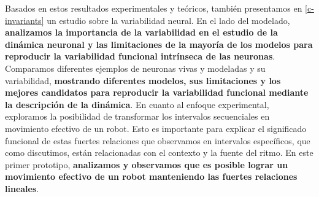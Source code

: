 Basados en estos resultados experimentales y teóricos, también presentamos en \ref{c-invariants} un estudio sobre la variabilidad neural. En el lado del modelado, \textbf{analizamos la importancia de la variabilidad en el estudio de la dinámica neuronal y las limitaciones de la mayoría de los modelos para reproducir la variabilidad funcional intrínseca de las neuronas}. Comparamos diferentes ejemplos de neuronas vivas y modeladas y su variabilidad, \textbf{mostrando diferentes modelos, sus limitaciones y los mejores candidatos para reproducir la variabilidad funcional mediante la descripción de la dinámica}. En cuanto al enfoque experimental, exploramos la posibilidad de transformar los intervalos secuenciales en movimiento efectivo de un robot. Esto es importante para explicar el significado funcional de estas fuertes relaciones que observamos en intervalos específicos, que como discutimos, están relacionadas con el contexto y la fuente del ritmo. En este primer prototipo, \textbf{analizamos y observamos que es posible lograr un movimiento efectivo de un robot manteniendo las fuertes relaciones lineales}.

